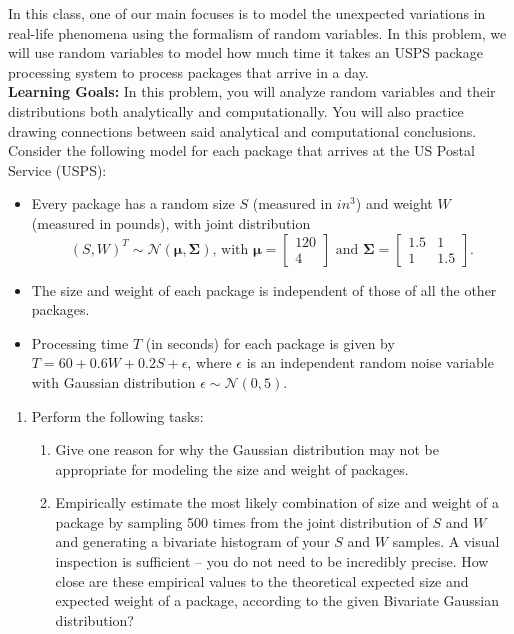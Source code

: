 \documentclass{harvardml}
\theoremstyle{definition}
\theoremstyle{plain}
\begin{document}
\begin{problem}
In this class, one of our main focuses is to model the unexpected variations in real-life phenomena using the formalism of random variables. In this problem, we will use random variables to model how much time it takes an USPS package processing system to process packages that arrive in a day.\\

\noindent \textbf{Learning Goals:} In this problem, you will analyze random variables and their distributions both analytically and computationally. You will also practice drawing connections between said analytical and computational conclusions.\\

\noindent Consider the following model for each package that arrives at the US Postal Service (USPS):
\begin{itemize}
    \item Every package has a random size $S$ (measured in $in^3$) and weight $W$ (measured in pounds), with joint distribution
    $$(S, W)^{T} \sim \mathcal{N}\left( \boldsymbol{\mu}, \boldsymbol{\Sigma}\right) \text{, with } \boldsymbol{\mu} = \begin{bmatrix} 120 \\ 4 \end{bmatrix} \text{ and } \boldsymbol{\Sigma} = \begin{bmatrix} 1.5 & 1 \\ 1 & 1.5 \end{bmatrix}.$$ 
    \item The size and weight of each package is independent of those of all the other packages.
    \item Processing time $T$ (in seconds) for each package is given by $T = 60 + 0.6 W + 0.2 S + \epsilon$, where $\epsilon$ is an independent random noise variable with Gaussian distribution $\epsilon \sim \mathcal{N}(0, 5)$.
\end{itemize}

\begin{enumerate}
    \item Perform the following tasks:
    \begin{enumerate}
        \item Give one reason for why the Gaussian distribution may not be appropriate for modeling the size and weight of packages.
        
        \item Empirically estimate the most likely combination of size and weight of a package by sampling 500 times from the joint distribution of $S$ and $W$ and generating a bivariate histogram of your $S$ and $W$ samples. A visual inspection is sufficient -- you do not need to be incredibly precise.  How close are these empirical values to the theoretical expected size and expected weight of a package, according to the given Bivariate Gaussian distribution?


\end{enumerate}
\end{enumerate}
\end{problem}
\end{document}
